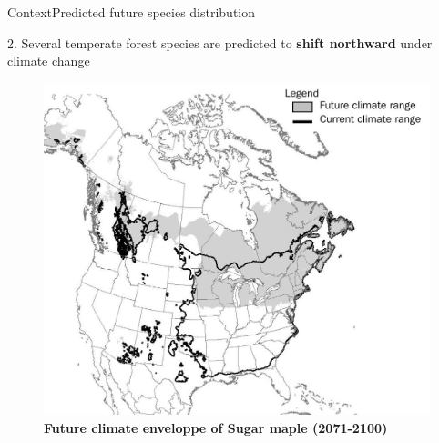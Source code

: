 \documentclass[10pt,aspectratio=149]{beamer}
\begin{document}
\begin{frame}{Context}{Predicted future species distribution}

2. Several temperate forest species are predicted to \textbf{shift northward} under climate change

	\begin{figure}
		\includegraphics[width=.40\paperwidth]{Figs/sugar_map_distrib.jpg}
	\caption{ \textbf{Future climate enveloppe of Sugar maple (2071-2100)}}
	\end{figure}


\end{frame}


\end{document}
